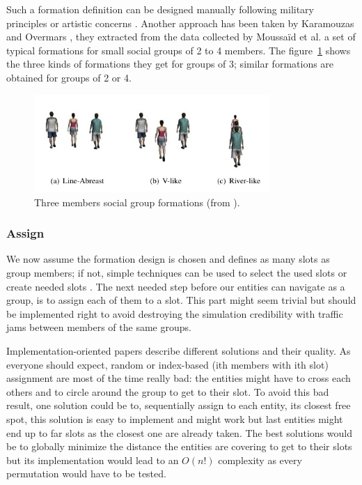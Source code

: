 \documentclass{article}
\begin{document}
Such a formation definition can be designed manually following military principles or artistic concerns \cite{Dawson:2002vd}.  Another approach has been taken by Karamouzas and Overmars \cite{Karamouzas:2010fi}, they extracted from the data collected by Moussaïd et al. \cite{Moussaid:2010ib} a set of typical formations for small social groups of 2 to 4 members. The figure~\ref{fig:social_group_formations} shows the three kinds of formations they get for groups of 3; similar formations are obtained for groups of 2 or 4. 

\begin{figure}[htb]
\centering
\includegraphics[width=0.8\textwidth]{SocialGroupFormations.jpg}
\caption{Three members social group formations (from \cite{Karamouzas:2010fi}).}
\label{fig:social_group_formations}
\end{figure} 

\subsubsection{Assign}
We now assume the formation design is chosen and defines as many slots as group members; if not, simple techniques can be used to select the used slots or create needed slots \cite{Silveira:2008bc}. The next needed step before our entities can navigate as a group, is to assign each of them to a slot. This part might seem trivial but should be implemented right to avoid destroying the simulation credibility with traffic jams between members of the same groups.

Implementation-oriented papers \cite{Dawson:2002vd,Millington:2006wz} describe different solutions and their quality. As everyone should expect, random or index-based (ith members with ith slot) assignment are most of the time really bad: the entities might have to cross each others and to circle around the group to get to their slot. To avoid this bad result, one solution could be to, sequentially assign to each entity, its closest free spot, this solution is easy to implement and might work but last entities might end up to far slots as the closest one are already taken. The best solutions would be to globally minimize the distance the entities are covering to get to their slots but its implementation would lead to an $O(n!)$ complexity as every permutation would have to be tested. 
\end{document}
